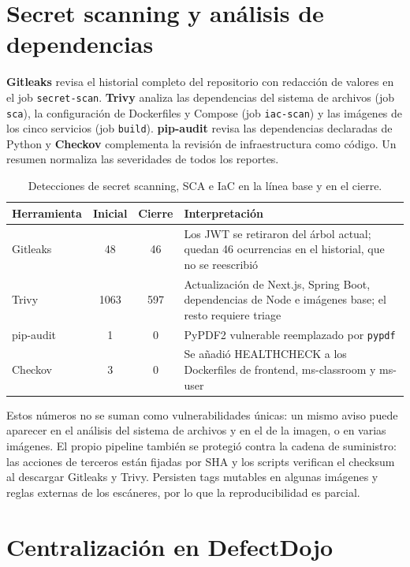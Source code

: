 \documentclass[12pt,a4paper]{article}
\begin{document}
\section{Secret scanning y análisis de dependencias}
\label{sec:sca}

\textbf{Gitleaks} revisa el historial completo del repositorio con redacción de valores en el job
\texttt{secret-scan}. \textbf{Trivy} analiza las dependencias del sistema de archivos (job
\texttt{sca}), la configuración de Dockerfiles y Compose (job \texttt{iac-scan}) y las imágenes de
los cinco servicios (job \texttt{build}). \textbf{pip-audit} revisa las dependencias declaradas de
Python y \textbf{Checkov} complementa la revisión de infraestructura como código. Un resumen
normaliza las severidades de todos los reportes.

\begin{table}[htbp]
  \centering
  \caption{Detecciones de secret scanning, SCA e IaC en la línea base y en el cierre.}
  \label{tab:sca}
  \small
  \begin{tabularx}{\textwidth}{lccY}
    \toprule
    \textbf{Herramienta} & \textbf{Inicial} & \textbf{Cierre} & \textbf{Interpretación} \\
    \midrule
    Gitleaks & 48 & 46 & Los JWT se retiraron del árbol actual; quedan 46 ocurrencias en el
    historial, que no se reescribió \\
    Trivy & 1063 & 597 & Actualización de Next.js, Spring Boot, dependencias de Node e imágenes
    base; el resto requiere triage \\
    pip-audit & 1 & 0 & PyPDF2 vulnerable reemplazado por \texttt{pypdf} \\
    Checkov & 3 & 0 & Se añadió HEALTHCHECK a los Dockerfiles de frontend, ms-classroom y
    ms-user \\
    \bottomrule
  \end{tabularx}
\end{table}

Estos números no se suman como vulnerabilidades únicas: un mismo aviso puede aparecer en el
análisis del sistema de archivos y en el de la imagen, o en varias imágenes. El propio pipeline
también se protegió contra la cadena de suministro: las acciones de terceros están fijadas por SHA
y los scripts verifican el checksum al descargar Gitleaks y Trivy. Persisten tags mutables en
algunas imágenes y reglas externas de los escáneres, por lo que la reproducibilidad es parcial.

\section{Centralización en DefectDojo}
\label{sec:defectdojo}
\end{document}

